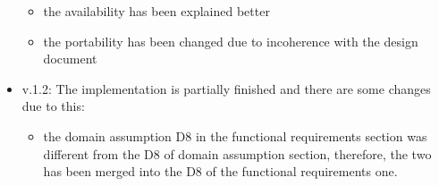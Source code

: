 \begin{itemize}
\begin{itemize}
	\item the availability has been explained better
	\item the portability has been changed due to incoherence with the design document
	\end{itemize}
\item v.1.2: The implementation is partially finished and there are some changes due to this:
\begin{itemize}
	\item the domain assumption D8 in the functional requirements section was different from the D8 of domain assumption section, therefore, the two has been merged into the D8 of the functional requirements one.
\end{itemize}
\end{itemize}